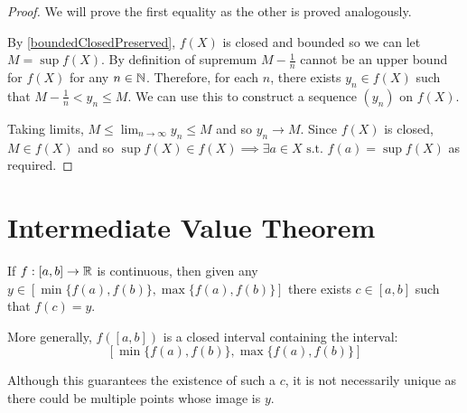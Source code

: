 \documentclass[../main.tex]{subfiles}
\begin{document}
\begin{proof}
  We will prove the first equality as the other is proved analogously.

  By \cref{boundedClosedPreserved}, $f(X)$ is closed and bounded so we can let $M = \sup f(X)$.
  By definition of supremum $M - \frac{1}{n}$ cannot be an upper bound for $f(X)$ for any $n \in \mathbb{N}$.
  Therefore, for each $n$, there exists $y_n \in f(X)$ such that $M - \frac{1}{n} < y_n \leq M$.
  We can use this to construct a sequence $(y_n)$ on $f(X)$.

  Taking limits, $M \leq \lim_{n \to \infty} y_n \leq M$ and so $y_n \to M$.
  Since $f(X)$ is closed, $M \in f(X)$ and so $\sup f(X) \in f(X) \implies \exists a \in X \text{ s.t. } f(a) = \sup f(X)$ as required.
\end{proof}
\section{Intermediate Value Theorem}
\begin{theorem}
  If $f: [a, b] \to \mathbb{R}$ is continuous, then given any $y \in [\min\{f(a), f(b)\}, \max\{f(a), f(b)\}]$ there exists $c \in [a, b]$ such that $f(c) = y$.
  \label{IVT}

  More generally, $f([a, b])$ is a closed interval containing the interval:
  \[
    [\min\{f(a), f(b)\}, \max\{f(a), f(b)\}]
  \]
\end{theorem}
\begin{remark}
  Although this guarantees the existence of such a $c$, it is not necessarily unique as there could be multiple points whose image is $y$.
\end{remark}
\end{document}
